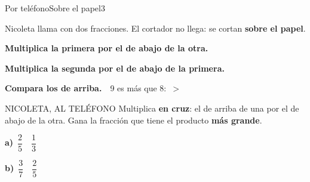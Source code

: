 \documentclass[12pt]{article}
\begin{document}
\begin{ficha}{Por teléfono}{Sobre el papel}{3}

\begin{encargo}
Nicoleta llama con dos fracciones. El cortador no llega: se cortan \textbf{sobre el papel}.
\end{encargo}


\vspace{1.5mm}
\textbf{Multiplica la primera por el de abajo de la otra.}\quad {}

\vspace{1mm}
\textbf{Multiplica la segunda por el de abajo de la primera.}\quad {}

\vspace{1mm}
\textbf{Compara los de arriba.}\ \ 9 es más que 8:\quad {}\ $>$\ 

\vspace{1mm}
\quad{}

\vspace{1mm}
\begin{voz}[nicoleta]{NICOLETA, AL TELÉFONO}
Multiplica \textbf{en cruz}: el de arriba de una por el de abajo de la otra.
Gana la fracción que tiene el producto \textbf{más grande}.
\end{voz}


\vspace{1mm}
\textbf{a)}\ \hfill $\dfrac{2}{5}$\ \signo\ $\dfrac{1}{3}$

\vspace{1mm}
\textbf{b)}\ \hfill $\dfrac{3}{7}$\ \signo\ $\dfrac{2}{5}$




\end{ficha}
\end{document}
